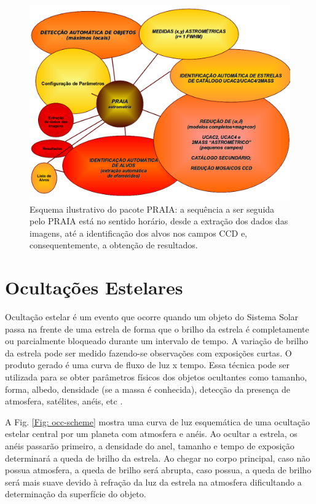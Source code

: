 \documentclass[12pt,a4paper]{monografia}
\begin{document}
\begin{figure}[h]
\centering
\includegraphics[scale=0.4]{figuras/PRAIA.png}
\caption[Esquema ilustrativo do pacote PRAIA]{Esquema ilustrativo do pacote PRAIA: a sequência a ser seguida pelo PRAIA está no sentido horário, desde a extração dos dados das imagens, até a identificação dos alvos nos campos CCD e, consequentemente, a obtenção de resultados.}
\label{Fig:PRAIA}
\end{figure}

\chapter{Ocultações Estelares}
\label{Cap: ocultacoes}

\indent \indent Ocultação estelar é um evento que ocorre quando um objeto do Sistema Solar passa na frente de uma estrela de forma que o brilho da estrela é completamente ou parcialmente bloqueado durante um intervalo de tempo. A variação de brilho da estrela pode ser medido fazendo-se observações com exposições curtas. O produto gerado é uma curva de fluxo de luz x tempo. Essa técnica pode ser utilizada para se obter parâmetros físicos dos objetos ocultantes como tamanho, forma, albedo, densidade (se a massa é conhecida), detecção da presença de atmosfera, satélites, anéis, etc \citep{Elliot1979}.

A Fig. \ref{Fig: occ-scheme} mostra uma curva de luz esquemática de uma ocultação estelar central por um planeta com atmosfera e anéis. Ao ocultar a estrela, os anéis passarão primeiro, a densidade do anel, tamanho e tempo de exposição determinará a queda de brilho da estrela. Ao chegar no corpo principal, caso não possua atmosfera, a queda de brilho será abrupta, caso possua, a queda de brilho será mais suave devido à refração da luz da estrela na atmosfera dificultando a determinação da superfície do objeto.
\end{document}
